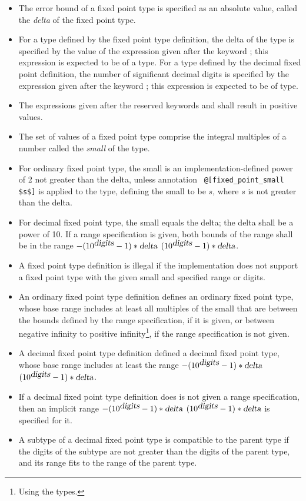 \begin{itemize}
  \item[] The error bound of a fixed point type is specified as an absolute value, called the {\em delta} of the fixed point type. 
  \item[] For a type defined by the fixed point type definition, the delta of the type is specified by the value of the expression given after the keyword ; this expression is expected to be of a  type. For a type defined by the decimal fixed point definition, the number of significant decimal digits is specified by the expression given after the keyword ; this expression is expected to be of  type. 
  \item[] The expressions given after the reserved keywords  and  shall result in positive values. 
  \item[] The set of values of a fixed point type comprise the integral multiples of a number called the {\em small} of the type. 
  \item[] For ordinary fixed point type, the small is an implementation-defined power of 2 not greater than the delta, unless annotation ~\lstinline!@[fixed_point_small $s$]! is applied to the type, defining the small to be $s$, where $s$ is not greater than the delta. 
  \item[] For decimal fixed point type, the small equals the delta; the delta shall be a power of 10. If a range specification is given, both bounds of the range shall be in the range $-(10^{\mbox{\sl digits}}-1)*\mbox{\sl delta}$  $(10^{\mbox{\sl digits}}-1)*\mbox{\sl delta}$. 
  \item[] A fixed point type definition is illegal if the implementation does not support a fixed point type with the given small and specified range or digits. 
  \item[] An ordinary fixed point type definition defines an ordinary fixed point type, whose base range includes at least all multiples of the small that are between the bounds defined by the range specification, if it is given, or between negative infinity to positive infinity\footnote{Using the  types.}, if the range specification is not given.
  \item[] A decimal fixed point type definition defined a decimal fixed point type, whose base range includes at least the range $-(10^{\mbox{\sl digits}}-1)*\mbox{\sl delta}$  $(10^{\mbox{\sl digits}}-1)*\mbox{\sl delta}$. 
  \item[] If a decimal fixed point type definition does is not given a range specification, then an implicit range $-(10^{\mbox{\sl digits}}-1)*\mbox{\sl delta}$  $(10^{\mbox{\sl digits}}-1)*\mbox{\sl delta}$ is specified for it. 
  \item[] A subtype of a decimal fixed point type is compatible to the parent type if the digits of the subtype are not greater than the digits of the parent type, and its range fits to the range of the parent type. 
\end{itemize}

